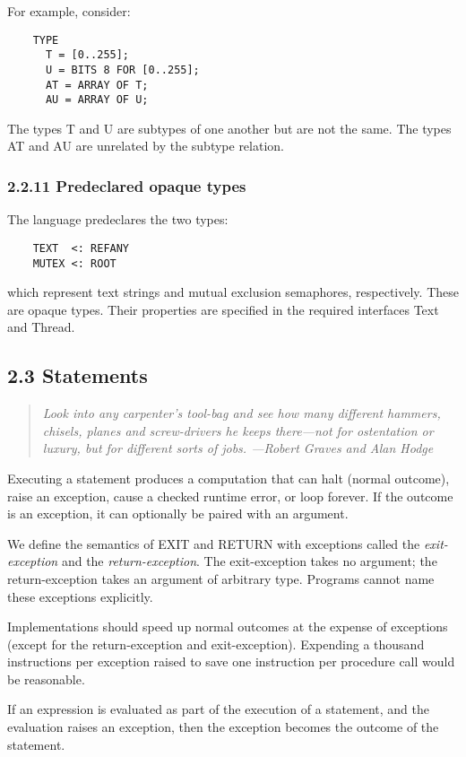 \documentclass[10pt]{article}
\begin{document}
For example, consider:
\begin{verbatim}
    TYPE
      T = [0..255];
      U = BITS 8 FOR [0..255];
      AT = ARRAY OF T;
      AU = ARRAY OF U;
\end{verbatim}
The types T and U are subtypes of one another but are not the same.  The types
AT and AU are unrelated by the subtype relation.

\subsubsection*{2.2.11 Predeclared opaque types}

The language predeclares the two types:
\begin{verbatim}
    TEXT  <: REFANY
    MUTEX <: ROOT
\end{verbatim}
which represent text strings and mutual exclusion semaphores, respectively.
These are opaque types.  Their properties are specified in the required
interfaces Text and Thread.

\subsection*{2.3 Statements}

\begin{quote}
  \emph{ Look into any carpenter's tool-bag and see how many different
    hammers, chisels, planes and screw-drivers he keeps there---not for
    ostentation or luxury, but for different sorts of jobs.  ---Robert Graves
    and Alan Hodge }
\end{quote}

Executing a statement produces a computation that can halt (normal outcome),
raise an exception, cause a checked runtime error, or loop forever.  If the
outcome is an exception, it can optionally be paired with an argument.

We define the semantics of EXIT and RETURN with exceptions called the
\emph{exit-exception} and the \emph{return-exception}.  The exit-exception
takes no argument; the return-exception takes an argument of arbitrary type.
Programs cannot name these exceptions explicitly.

Implementations should speed up normal outcomes at the expense of exceptions
(except for the return-exception and exit-exception).  Expending a thousand
instructions per exception raised to save one instruction per procedure call
would be reasonable.

If an expression is evaluated as part of the execution of a statement, and the
evaluation raises an exception, then the exception becomes the outcome of the
statement.
\end{document}
